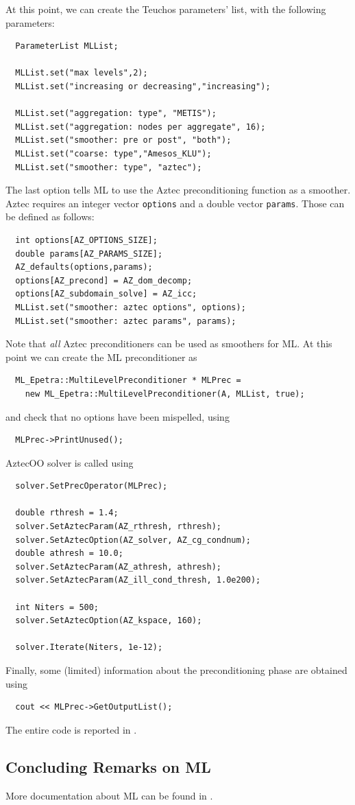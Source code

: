 At this point, we can create the Teuchos parameters' list, with the
following parameters:
\begin{verbatim}
  ParameterList MLList;

  MLList.set("max levels",2);
  MLList.set("increasing or decreasing","increasing");

  MLList.set("aggregation: type", "METIS");
  MLList.set("aggregation: nodes per aggregate", 16);
  MLList.set("smoother: pre or post", "both");
  MLList.set("coarse: type","Amesos_KLU");
  MLList.set("smoother: type", "aztec");
\end{verbatim}
The last option tells ML to use the Aztec preconditioning function as a
smoother. Aztec requires an integer vector \verb!options! and a double
vector \verb!params!. Those can be defined as follows:
\begin{verbatim}
  int options[AZ_OPTIONS_SIZE];
  double params[AZ_PARAMS_SIZE];
  AZ_defaults(options,params);
  options[AZ_precond] = AZ_dom_decomp;
  options[AZ_subdomain_solve] = AZ_icc;
  MLList.set("smoother: aztec options", options);
  MLList.set("smoother: aztec params", params);
\end{verbatim}
Note that {\sl all} Aztec preconditioners can be used as smoothers for
ML. 
At this point we can create the ML preconditioner as
\begin{verbatim}
  ML_Epetra::MultiLevelPreconditioner * MLPrec =
    new ML_Epetra::MultiLevelPreconditioner(A, MLList, true);
\end{verbatim}
and check that no options have been mispelled, using
\begin{verbatim}
  MLPrec->PrintUnused();
\end{verbatim}
AztecOO solver is called using
\begin{verbatim}
  solver.SetPrecOperator(MLPrec);

  double rthresh = 1.4;
  solver.SetAztecParam(AZ_rthresh, rthresh);
  solver.SetAztecOption(AZ_solver, AZ_cg_condnum);
  double athresh = 10.0;
  solver.SetAztecParam(AZ_athresh, athresh);
  solver.SetAztecParam(AZ_ill_cond_thresh, 1.0e200);

  int Niters = 500;
  solver.SetAztecOption(AZ_kspace, 160);

  solver.Iterate(Niters, 1e-12);
\end{verbatim}
Finally, some (limited) information about the preconditioning phase are
obtained using
\begin{verbatim}
  cout << MLPrec->GetOutputList();
\end{verbatim}

The entire code is reported in .


\subsection{Concluding Remarks on ML}
\label{sec:ml_concluding}

More documentation about ML can be found in
\cite{ML-home-page,TuminaroTong:00,TuminaroTong:00}.

